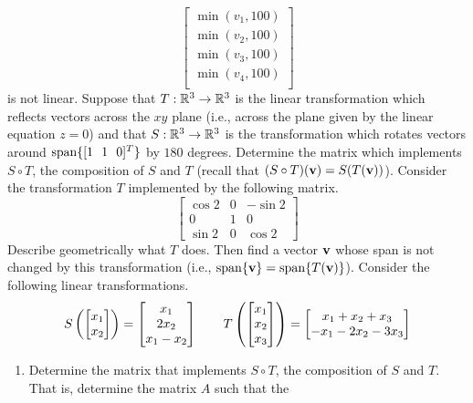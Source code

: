 \begin{tasks}[resume, style=enumerate]
\begin{displaymath}
\begin{bmatrix}
      \min(v_1, 100) \\
      \min(v_2, 100) \\
      \min(v_3, 100) \\
      \min(v_4, 100) \\
    \end{bmatrix}
  \end{displaymath}
  is not linear.
\task
  Suppose that $T : \mathbb R^3 \to \mathbb R^3$ is the linear transformation which
  reflects vectors across the $xy$ plane (i.e., across the plane given
  by the linear equation $z = 0$) and that $S : \mathbb R^3 \to \mathbb R^3$ is the
  transformation which rotates vectors around $\operatorname{\mathrm{span}}\{[1 \ \ 1
    \ \ 0]^T\}$ by $180$ degrees.  Determine the matrix which
  implements $S \circ T$, the composition of $S$ and $T$ (recall that
  $(S \circ T)(\mathbf v) = S(T(\mathbf v))$).
\task
  Consider the transformation $T$ implemented by the following
  matrix.
  \begin{displaymath}
    \begin{bmatrix}
      \cos2 & 0 & -\sin2 \\
      0 & 1 & 0 \\
      \sin2 & 0 & \cos2
    \end{bmatrix}
  \end{displaymath}
  Describe geometrically what $T$ does.  Then find a vector $\mathbf v$
  whose span is not changed by this transformation (i.e.,
  $\operatorname{\mathrm{span}}\{\mathbf v\} = \operatorname{\mathrm{span}}\{T(\mathbf v)\}$).
\task
  Consider the following linear transformations.
  \begin{align*}
    S
    \left(
     \begin{bmatrix} x_1 \\ x_2 \end{bmatrix} 
    \right)
    =
    \begin{bmatrix}
      x_1 \\ 2 x_2 \\ x_1 - x_2
    \end{bmatrix}
    \qquad
    T
    \left(
    \begin{bmatrix}
      x_1 \\ x_2 \\ x_3
    \end{bmatrix}
    \right)
    =
    \begin{bmatrix}
      x_1 + x_2 + x_3 \\
      -x_1 - 2x_2 - 3x_3
    \end{bmatrix}
  \end{align*}
  \begin{enumerate}[label=(\alph*)]
  \item
    Determine the matrix that implements $S \circ T$, the composition
    of $S$ and $T$.  That is, determine the matrix $A$ such that the

\end{enumerate}
\end{tasks}
